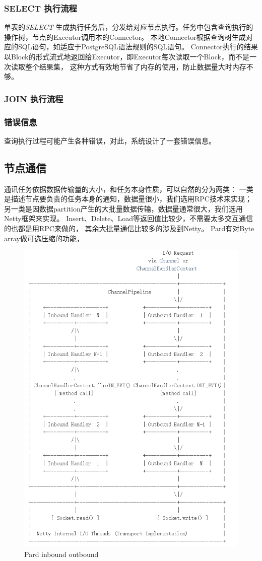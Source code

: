 \documentclass[a4paper, 12pt]{ctexart}
\begin{document}
\subsubsection{SELECT 执行流程}
单表的\textit{SELECT} 生成执行任务后，分发给对应节点执行。任务中包含查询执行的操作树，节点的Executor调用本的Connector。
本地Connector根据查询树生成对应的SQL语句，如适应于PostgreSQL语法规则的SQL语句。
Connector执行的结果以Block的形式流式地返回给Executor，即Executor每次读取一个Block，而不是一次读取整个结果集，
这种方式有效地节省了内存的使用，防止数据量大时内存不够。

\subsubsection{JOIN 执行流程}


\subsubsection{错误信息}
查询执行过程可能产生各种错误，对此，系统设计了一套错误信息。

\subsection{节点通信}
通讯任务依据数据传输量的大小，和任务本身性质，可以自然的分为两类：
一类是描述节点要负责的任务本身的通知，数据量很小，我们选用RPC技术来实现；
另一类是因数据partition产生的大批量数据传输，数据量通常很大，我们选用Netty框架来实现。
Insert、Delete、Load等返回值比较少，不需要太多交互通信的也都是用RPC来做的，
其余大批量通信比较多的涉及到Netty。
Pard有对Byte array做可选压缩的功能，


\begin{figure}[htbp]
	\centering
	\includegraphics[width=0.7\linewidth]{figure/iobound.png}
	\caption{Pard inbound outbound}
	\label{fig:iobound}
\end{figure}
\end{document}
